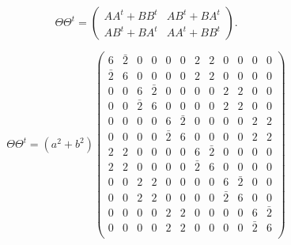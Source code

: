 \documentclass{beamer}
\begin{document}
\begin{frame}

  \[
    \Theta\Theta^t =
    \begin{pmatrix}
      AA^t + BB^t & AB^t + BA^t \\ AB^t + BA^t & AA^t + BB^t
    \end{pmatrix}.
  \]
  
\end{frame}

\begin{frame}

  \[
    \Theta\Theta^t = (a^2+b^2)
    \left(
      \begin{array}{cccccc|cccccc}
        6&\bar{2}&0&0&0&0&2&2&0&0&0&0\\
        \bar{2}&6&0&0&0&0&2&2&0&0&0&0\\
        0&0&6&\bar{2}&0&0&0&0&2&2&0&0\\
        0&0&\bar{2}&6&0&0&0&0&2&2&0&0\\
        0&0&0&0&6&\bar{2}&0&0&0&0&2&2\\
        0&0&0&0&\bar{2}&6&0&0&0&0&2&2\\ \hline
        2&2&0&0&0&0&6&\bar{2}&0&0&0&0\\
        2&2&0&0&0&0&\bar{2}&6&0&0&0&0\\
        0&0&2&2&0&0&0&0&6&\bar{2}&0&0\\
        0&0&2&2&0&0&0&0&\bar{2}&6&0&0\\
        0&0&0&0&2&2&0&0&0&0&6&\bar{2}\\
        0&0&0&0&2&2&0&0&0&0&\bar{2}&6\\
      \end{array}
    \right)
  \]
  
\end{frame}
\end{document}
